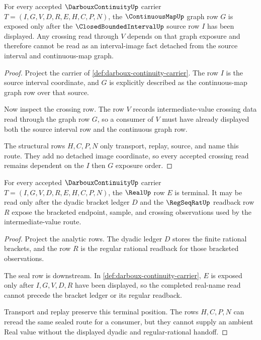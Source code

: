 \begin{theorem}
\label{thm:darboux-continuity-graph-exposure}
For every accepted $\DarbouxContinuityUp$ carrier $T=(I,G,V,D,R,E,H,C,P,N)$, the $\ContinuousMapUp$ graph row $G$ is exposed only after the $\ClosedBoundedIntervalUp$ source row $I$ has been displayed. Any crossing read through $V$ depends on that graph exposure and therefore cannot be read as an interval-image fact detached from the source interval and continuous-map graph.
\end{theorem}
\begin{proof}
Project the carrier of \autoref{def:darboux-continuity-carrier}. The row $I$ is the source interval coordinate, and $G$ is explicitly described as the continuous-map graph row over that source.

Now inspect the crossing row. The row $V$ records intermediate-value crossing data read through the graph row $G$, so a consumer of $V$ must have already displayed both the source interval row and the continuous graph row.

The structural rows $H,C,P,N$ only transport, replay, source, and name this route. They add no detached image coordinate, so every accepted crossing read remains dependent on the $I$ then $G$ exposure order.
\end{proof}

\begin{theorem}
\label{thm:darboux-continuity-real-seal-handoff}
For every accepted $\DarbouxContinuityUp$ carrier $T=(I,G,V,D,R,E,H,C,P,N)$, the $\RealUp$ row $E$ is terminal. It may be read only after the dyadic bracket ledger $D$ and the $\RegSeqRatUp$ readback row $R$ expose the bracketed endpoint, sample, and crossing observations used by the intermediate-value route.
\end{theorem}
\begin{proof}
Project the analytic rows. The dyadic ledger $D$ stores the finite rational brackets, and the row $R$ is the regular rational readback for those bracketed observations.

The seal row is downstream. In \autoref{def:darboux-continuity-carrier}, $E$ is exposed only after $I,G,V,D,R$ have been displayed, so the completed real-name read cannot precede the bracket ledger or its regular readback.

Transport and replay preserve this terminal position. The rows $H,C,P,N$ can reread the same sealed route for a consumer, but they cannot supply an ambient Real value without the displayed dyadic and regular-rational handoff.
\end{proof}


